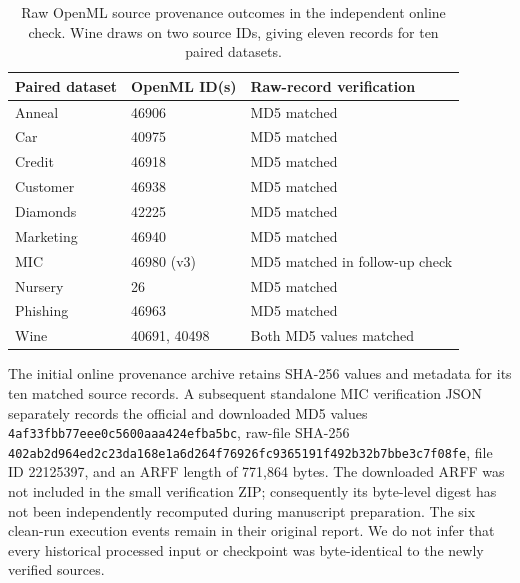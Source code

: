 \documentclass[a4paper,fleqn]{cas-sc}
\begin{document}
\begin{table}[htbp]
\centering
\caption{Raw OpenML source provenance outcomes in the independent online check. Wine draws on two source IDs, giving eleven records for ten paired datasets.}
\label{tab:openmlprovenance}
\begin{tabular}{lll}
\toprule
Paired dataset & OpenML ID(s) & Raw-record verification\\
\midrule
Anneal & 46906 & MD5 matched\\
Car & 40975 & MD5 matched\\
Credit & 46918 & MD5 matched\\
Customer & 46938 & MD5 matched\\
Diamonds & 42225 & MD5 matched\\
Marketing & 46940 & MD5 matched\\
MIC & 46980 (v3) & MD5 matched in follow-up check\\
Nursery & 26 & MD5 matched\\
Phishing & 46963 & MD5 matched\\
Wine & 40691, 40498 & Both MD5 values matched\\
\bottomrule
\end{tabular}
\end{table}
The initial online provenance archive retains SHA-256 values and metadata for its ten matched source records. A subsequent standalone MIC verification JSON separately records the official and downloaded MD5 values \texttt{4af33fbb77eee0c5\allowbreak 600aaa424efba5bc}, raw-file SHA-256 \texttt{402ab2d964ed2c23\allowbreak da168e1a6d264f76\allowbreak 926fc9365191f492\allowbreak b32b7bbe3c7f08fe}, file ID 22125397, and an ARFF length of 771,864 bytes. The downloaded ARFF was not included in the small verification ZIP; consequently its byte-level digest has not been independently recomputed during manuscript preparation. The six clean-run execution events remain in their original report. We do not infer that every historical processed input or checkpoint was byte-identical to the newly verified sources.
\end{document}
